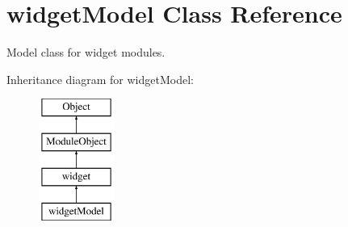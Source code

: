 \hypertarget{classwidgetModel}{\section{widget\-Model Class Reference}
\label{classwidgetModel}
}


Model class for widget modules.  


Inheritance diagram for widget\-Model\-:\begin{figure}[H]
\begin{center}
\leavevmode
\includegraphics[height=4.000000cm]{classwidgetModel}
\end{center}
\end{figure}
